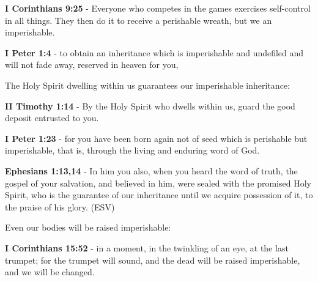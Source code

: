\documentclass[11pt]{article}
\begin{document}
\textbf{I Corinthians 9:25} - Everyone who competes in the games exercises self-control in all things. They then do it to receive a perishable wreath, but we an imperishable.

\textbf{I Peter 1:4} - to obtain an inheritance which is imperishable and undefiled and will not fade away, reserved in heaven for you,

The Holy Spirit dwelling within us guarantees our imperishable inheritance:

\textbf{II Timothy 1:14} - By the Holy Spirit who dwells within us, guard the good deposit entrusted to you.

\textbf{I Peter 1:23} - for you have been born again not of seed which is perishable but imperishable, that is, through the living and enduring word of God.

\textbf{Ephesians 1:13,14} -  In him you also, when you heard the word of truth, the gospel of your salvation, and believed in him, were sealed with the promised Holy Spirit, who is the guarantee of our inheritance until we acquire possession of it, to the praise of his glory.  (ESV)

Even our bodies will be raised imperishable:

\textbf{I Corinthians 15:52} - in a moment, in the twinkling of an eye, at the last trumpet; for the trumpet will sound, and the dead will be raised imperishable, and we will be changed.
\end{document}

